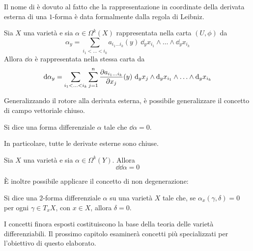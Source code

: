Il nome di  è dovuto al fatto che la rappresentazione in coordinate della derivata esterna di una $1$-forma è data formalmente dalla regola di Leibniz.
\begin{theorem} \label{thm:derivCoords}
  Sia $X$ una varietà e sia $\alpha \in \Omega^k(X)$ rappresentata nella carta $(U, \phi)$ da \begin{equation}
    \alpha_y = \sum_{i_1 < \ldots < i_k} a_{i_1\ldots i_k}(y)\ \dd_y x_{i_1} \wedge \ldots \wedge \dd_y x_{i_k}
    \end{equation}
    Allora $\dd{\alpha}$ è rappresentata nella stessa carta da
    \begin{equation}
      \dd{\alpha_y} = \sum_{i_1 < \ldots < i_k} \sum_{j=1}^n \pdv{a_{i_1\ldots i_k}}{x_j}()(y)\ \dd_y x_{j} \wedge \dd_y x_{i_1} \wedge \ldots \wedge \dd_y x_{i_k}
      \end{equation}
\end{theorem}

Generalizzando il rotore alla derivata esterna, è possibile generalizzare il concetto di campo vettoriale chiuso.
\begin{definition}
  Si dice  una forma differenziale $\alpha$ tale che $\dd \alpha = 0$. 
\end{definition}
In particolare, tutte le derivate esterne sono chiuse.
\begin{theorem}
  Sia $X$ una varietà e sia $\alpha \in \Omega^k(Y)$. Allora 
  \begin{equation}
  \dd{\dd{\alpha}} = 0
  \end{equation} 
\end{theorem}

È inoltre possibile applicare il concetto di non degenerazione:
\begin{definition}
  Si dice  una $2$-forma differenziale $\alpha$ su una varietà $X$ tale che, se $\alpha_x (\gamma, \delta) = 0$ per ogni $\gamma \in T_x X$, con $x \in  X$, allora $\delta = 0$.
\end{definition}

I concetti finora esposti costituiscono la base della teoria delle varietà differenziabili. Il prossimo capitolo esaminerà concetti più specializzati per l'obiettivo di questo elaborato.